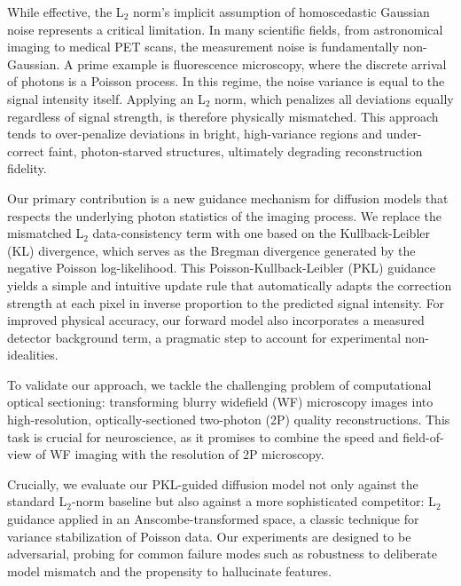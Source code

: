 \documentclass{article}
\newcommand{\wf}{WF\xspace}
\newcommand{\twop}{2P\xspace}
\begin{document}
While effective, the L$_2$ norm's implicit assumption of homoscedastic Gaussian noise represents a critical limitation. In many scientific fields, from astronomical imaging to medical PET scans, the measurement noise is fundamentally non-Gaussian. A prime example is fluorescence microscopy, where the discrete arrival of photons is a Poisson process. In this regime, the noise variance is equal to the signal intensity itself. Applying an L$_2$ norm, which penalizes all deviations equally regardless of signal strength, is therefore physically mismatched. This approach tends to over-penalize deviations in bright, high-variance regions and under-correct faint, photon-starved structures, ultimately degrading reconstruction fidelity.

Our primary contribution is a new guidance mechanism for diffusion models that respects the underlying photon statistics of the imaging process. We replace the mismatched L$_2$ data-consistency term with one based on the Kullback-Leibler (KL) divergence, which serves as the Bregman divergence generated by the negative Poisson log-likelihood. This Poisson-Kullback-Leibler (PKL) guidance yields a simple and intuitive update rule that automatically adapts the correction strength at each pixel in inverse proportion to the predicted signal intensity. For improved physical accuracy, our forward model also incorporates a measured detector background term, a pragmatic step to account for experimental non-idealities.

To validate our approach, we tackle the challenging problem of computational optical sectioning: transforming blurry widefield (\wf) microscopy images into high-resolution, optically-sectioned two-photon (\twop) quality reconstructions. This task is crucial for neuroscience, as it promises to combine the speed and field-of-view of \wf imaging with the resolution of \twop microscopy.

Crucially, we evaluate our PKL-guided diffusion model not only against the standard L$_2$-norm baseline but also against a more sophisticated competitor: L$_2$ guidance applied in an Anscombe-transformed space, a classic technique for variance stabilization of Poisson data. Our experiments are designed to be adversarial, probing for common failure modes such as robustness to deliberate model mismatch and the propensity to hallucinate features.
\end{document}
